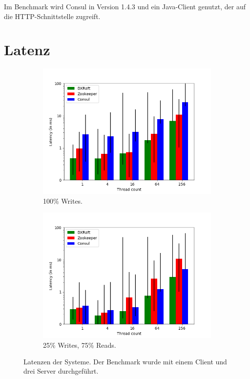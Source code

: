 Im Benchmark wird Consul in Version 1.4.3 und ein Java-Client \cite{consul-client} genutzt, der auf die HTTP-Schnittstelle zugreift.

\section{Latenz}
\label{latency}

\begin{figure}[t]
	\centering
	\begin{subfigure}[t]{0.45\textwidth}
		\includegraphics[width=\textwidth]{img/latency.png}
		\caption{100\% Writes.}
	\end{subfigure}
	\begin{subfigure}[t]{0.45\textwidth}
		\includegraphics[width=\textwidth]{img/latency2.png}
		\caption{25\% Writes, 75\% Reads.}
	\end{subfigure}
	\caption{Latenzen der Systeme. Der Benchmark wurde mit einem Client und drei Server durchgeführt.}
	\label{fig:latency}
\end{figure}

